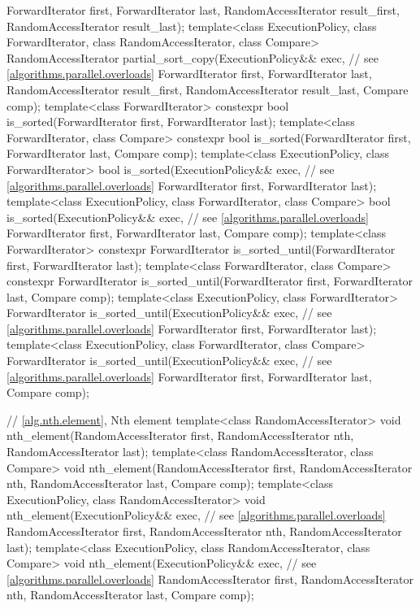\begin{codeblock}
{                        ForwardIterator first, ForwardIterator last,
                        RandomAccessIterator result_first,
                        RandomAccessIterator result_last);
  template<class ExecutionPolicy, class ForwardIterator, class RandomAccessIterator,
           class Compare>
    RandomAccessIterator
      partial_sort_copy(ExecutionPolicy&& exec,  // see \ref{algorithms.parallel.overloads}
                        ForwardIterator first, ForwardIterator last,
                        RandomAccessIterator result_first,
                        RandomAccessIterator result_last,
                        Compare comp);
  template<class ForwardIterator>
    constexpr bool is_sorted(ForwardIterator first, ForwardIterator last);
  template<class ForwardIterator, class Compare>
    constexpr bool is_sorted(ForwardIterator first, ForwardIterator last,
                             Compare comp);
  template<class ExecutionPolicy, class ForwardIterator>
    bool is_sorted(ExecutionPolicy&& exec, // see \ref{algorithms.parallel.overloads}
                   ForwardIterator first, ForwardIterator last);
  template<class ExecutionPolicy, class ForwardIterator, class Compare>
    bool is_sorted(ExecutionPolicy&& exec, // see \ref{algorithms.parallel.overloads}
                   ForwardIterator first, ForwardIterator last,
                   Compare comp);
  template<class ForwardIterator>
    constexpr ForwardIterator
      is_sorted_until(ForwardIterator first, ForwardIterator last);
  template<class ForwardIterator, class Compare>
    constexpr ForwardIterator
      is_sorted_until(ForwardIterator first, ForwardIterator last,
                      Compare comp);
  template<class ExecutionPolicy, class ForwardIterator>
    ForwardIterator
      is_sorted_until(ExecutionPolicy&& exec, // see \ref{algorithms.parallel.overloads}
                      ForwardIterator first, ForwardIterator last);
  template<class ExecutionPolicy, class ForwardIterator, class Compare>
    ForwardIterator
      is_sorted_until(ExecutionPolicy&& exec, // see \ref{algorithms.parallel.overloads}
                      ForwardIterator first, ForwardIterator last,
                      Compare comp);

  // \ref{alg.nth.element}, Nth element
  template<class RandomAccessIterator>
    void nth_element(RandomAccessIterator first, RandomAccessIterator nth,
                     RandomAccessIterator last);
  template<class RandomAccessIterator, class Compare>
    void nth_element(RandomAccessIterator first, RandomAccessIterator nth,
                     RandomAccessIterator last, Compare comp);
  template<class ExecutionPolicy, class RandomAccessIterator>
    void nth_element(ExecutionPolicy&& exec, // see \ref{algorithms.parallel.overloads}
                     RandomAccessIterator first, RandomAccessIterator nth,
                     RandomAccessIterator last);
  template<class ExecutionPolicy, class RandomAccessIterator, class Compare>
    void nth_element(ExecutionPolicy&& exec, // see \ref{algorithms.parallel.overloads}
                     RandomAccessIterator first, RandomAccessIterator nth,
                     RandomAccessIterator last, Compare comp);

}
\end{codeblock}
